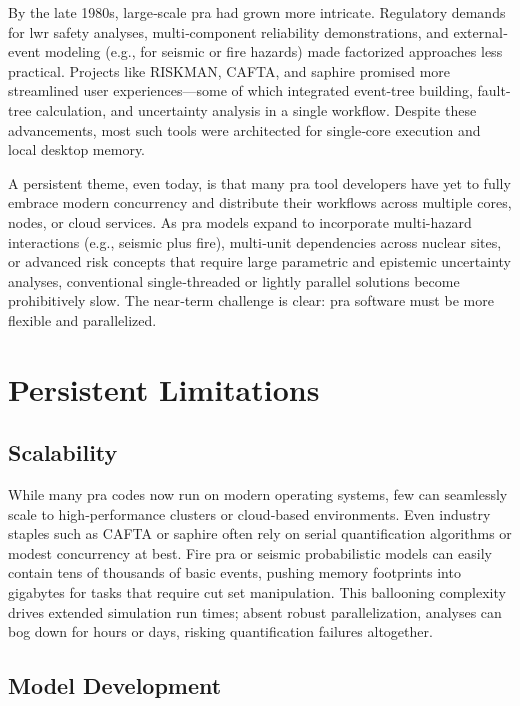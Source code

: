 By the late 1980s, large‐scale \acrshort{pra} had grown more intricate. Regulatory demands for \acrshort{lwr} safety analyses, multi‐component reliability demonstrations, and external‐event modeling (e.g., for seismic or fire hazards) made factorized approaches less practical. Projects like RISKMAN, CAFTA, and \acrshort{saphire} promised more streamlined user experiences—some of which integrated event-tree building, fault-tree calculation, and uncertainty analysis in a single workflow. Despite these advancements, most such tools were architected for single‐core execution and local desktop memory.

A persistent theme, even today, is that many \acrshort{pra} tool developers have yet to fully embrace modern concurrency and distribute their workflows across multiple cores, nodes, or cloud services. As \acrshort{pra} models expand to incorporate multi-hazard interactions (e.g., seismic plus fire), multi‐unit dependencies across nuclear sites, or advanced risk concepts that require large parametric and epistemic uncertainty analyses, conventional single‐threaded or lightly parallel solutions become prohibitively slow. The near‐term challenge is clear: \acrshort{pra} software must be more flexible and parallelized.


\section{Persistent Limitations}

\subsection*{Scalability}

While many \acrshort{pra} codes now run on modern operating systems, few can seamlessly scale to high‐performance clusters or cloud‐based environments. Even industry staples such as CAFTA or \acrshort{saphire} often rely on serial quantification algorithms or modest concurrency at best. Fire \acrshort{pra} or seismic probabilistic models can easily contain tens of thousands of basic events, pushing memory footprints into gigabytes for tasks that require cut set manipulation. This ballooning complexity drives extended simulation run times; absent robust parallelization, analyses can bog down for hours or days, risking quantification failures altogether.

\subsection*{Model Development}

